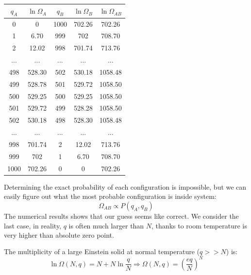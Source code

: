 \documentclass[~/PhyAI/phyai.tex]{subfiles}
\begin{document}
\begin{center}
	\begin{tabular}{ |c|c|c|c|c| }
		\hline
		$q_{A}$ & $\ln\Omega_{A}$ & $q_{B}$ & $\ln\Omega_{B}$ & $\ln\Omega_{AB}$ \\
		\hline
		0       & 0               & 1000    & 702.26          & 702.26           \\
		1       & 6.70            & 999     & 702             & 708.70           \\
		2       & 12.02           & 998     & 701.74          & 713.76           \\
		...     & ...             & ...     & ...             & ...              \\
		498     & 528.30          & 502     & 530.18          & 1058.48          \\
		499     & 528.78          & 501     & 529.72          & 1058.50          \\
		500     & 529.25          & 500     & 529.25          & 1058.50          \\
		501     & 529.72          & 499     & 528.28          & 1058.50          \\
		502     & 530.18          & 498     & 528.30          & 1058.48          \\
		...     & ...             & ...     & ...             & ...              \\
		998     & 701.74          & 2       & 12.02           & 713.76           \\
		999     & 702             & 1       & 6.70            & 708.70           \\
		1000    & 702.26          & 0       & 0               & 702.26           \\
		\hline
	\end{tabular}
\end{center}
Determining the exact probability of each configuration is impossible, but we can easily figure out what the most probable configuration is inside system:
$$ {\Omega_{AB}}\propto P(q_{A}, q_{B}) $$
The numerical results shows that our guess seems like correct. We consider the last case, in reality, $q$ is often much larger than $N$, thanks to room temperature is very higher than absolute zero point.
\begin{corollary}
	\label{Multiplicity of a Large Einstein Solid}
	The multiplicity of a large Einstein solid at normal temperature ($q>>N$) is:
	\begin{equation*}
		\ln{\Omega(N,q)}=N+N\ln{\frac{q }{N}}\Rightarrow \Omega(N,q)=\left(\frac{eq }{N}\right)^{N}
	\end{equation*}
\end{corollary}
\end{document}
